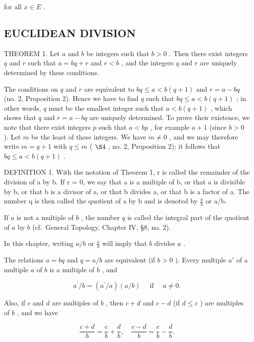 for all \(x \in E\) .

\subsection{EUCLIDEAN DIVISION}

THEOREM 1. Let \(a\) and \(b\) be integers such that \(b > 0\) . Then there exist integers \(q\) and \(r\) such that \(a = bq + r\) and \(r < b\) , and the integers \(q\) and \(r\) are uniquely determined by these conditions.

The conditions on \(q\) and \(r\) are equivalent to \(bq \leqslant a < b(q + 1)\) and \(r = a - bq\) (no. 2, Proposition 2). Hence we have to find \(q\) such that \(bq \leqslant a < b(q + 1)\) ; in other words, \(q\) must be the smallest integer such that \(a < b(q + 1)\) , which shows that \(q\) and \(r = a - bq\) are uniquely determined. To prove their existence, we note that there exist integers \(p\) such that \(a < bp\) , for example \(a + 1\) (since \(b > 0\) ). Let \(m\) be the least of these integers. We have \(m \neq 0\) , and we may therefore write \(m = q + 1\) with \(q \leqslant m\) ( \(\S 4\) , no. 2, Proposition 2); it follows that \(bq \leqslant a < b(q + 1)\) .

DEFINITION 1. With the notation of Theorem 1, r is called the remainder of the division of a by b. If r = 0, we say that a is a multiple of b, or that a is divisible by b, or that b is a divisor of a, or that b divides a, or that b is a factor of a. The number q is then called the quotient of a by b and is denoted by \(\frac{a}{b}\) or a/b.

If \(a\) is not a multiple of \(b\) , the number \(q\) is called the integral part of the quotient of \(a\) by \(b\) (cf.~General Topology, Chapter IV, §8, no. 2).

In this chapter, writing \(a / b\) or \(\frac{a}{b}\) will imply that \(b\) divides \(a\) .

The relations \(a = bq\) and \(q = a / b\) are equivalent (if \(b > 0\) ). Every multiple \(a'\) of a multiple \(a\) of \(b\) is a multiple of \(b\) , and

\[
a ^ {\prime} / b = (a ^ {\prime} / a) (a / b) \quad \text { if } \quad a \neq 0.
\]

Also, if \(c\) and \(d\) are multiples of \(b\) , then \(c + d\) and \(c - d\) (if \(d \leqslant c\) ) are multiples of \(b\) , and we have

\[
\frac {c + d}{b} = \frac {c}{b} + \frac {d}{b}, \quad \frac {c - d}{b} = \frac {c}{b} - \frac {d}{b}.
\]

